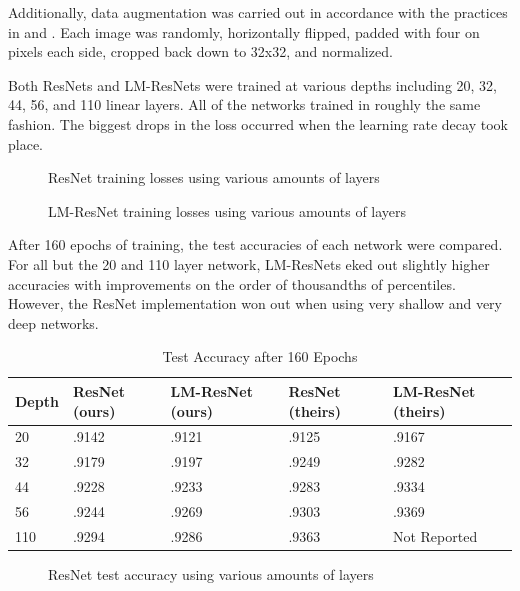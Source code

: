 \documentclass{article}
\begin{document}
Additionally, data augmentation was carried out in accordance with the practices in \citet{Lu} and \citet{He}.
Each image was randomly, horizontally flipped, padded with four on pixels each side, cropped back down
to 32x32, and normalized. 

Both ResNets and LM-ResNets were trained at various depths including 20, 32, 44, 56, and 110 linear layers. 
All of the networks trained in roughly the same fashion. The biggest drops in the loss occurred
when the learning rate decay took place. 

\begin{figure}[h]
  \centering    
  \def\svgwidth{\columnwidth}
  
  \caption{ResNet training losses using various amounts of layers}
\end{figure}

\begin{figure}[h]
  \centering    
  \def\svgwidth{\columnwidth}
  
  \caption{LM-ResNet training losses using various amounts of layers}
\end{figure}

After 160 epochs of training, the test accuracies of each network were compared. 
For all but the 20 and 110 layer network, LM-ResNets eked out slightly higher 
accuracies with improvements on the order of thousandths of percentiles. However,
the ResNet implementation won out when using very shallow and very deep networks.

\begin{table}[!ht]
  \caption{Test Accuracy after 160 Epochs}
  \centering
  \begin{tabular}{lllll}
    \toprule
    Depth & ResNet (ours) & LM-ResNet (ours) & ResNet (theirs) & LM-ResNet (theirs) \\
    \midrule
    20    & .9142 & .9121 & .9125 & .9167\\
    32    & .9179 & .9197 & .9249 & .9282\\
    44    & .9228 & .9233 & .9283 & .9334\\
    56    & .9244 & .9269 & .9303 & .9369\\
    110   & .9294 & .9286 & .9363 & Not Reported\\
    \bottomrule
  \end{tabular}
\end{table}

\begin{figure}[!ht]
  \centering    
  \def\svgwidth{\columnwidth}
  
  \caption{ResNet test accuracy using various amounts of layers}
\end{figure}
\end{document}
